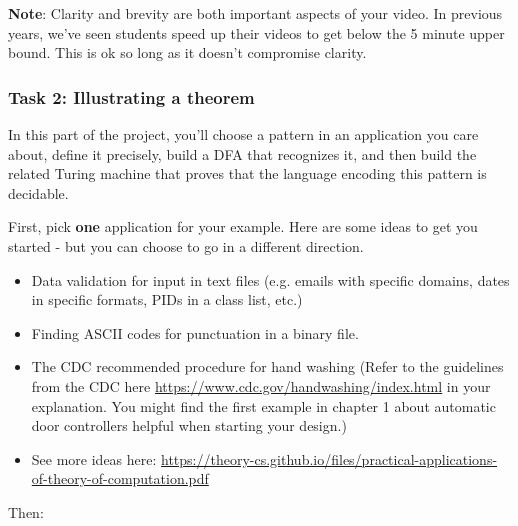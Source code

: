 \documentclass[12pt, oneside]{article}
\begin{document}
{\bf Note}: Clarity and brevity are both important aspects of your video.  In previous years, we've seen 
students speed up their videos to get below the 5 minute upper bound. This is ok so long as it doesn't 
compromise clarity.

\subsubsection*{Task 2: Illustrating a theorem}

In this part of the project, you'll choose a pattern in an application you care about, 
define it precisely, build a DFA that recognizes it, and then build the related Turing machine
that proves that the language encoding this pattern is decidable.

First, pick {\bf one} application for your example. 
Here are some ideas to get you started - but you can choose to go in a different direction.
\begin{itemize}
\item Data validation for input in text files (e.g. emails with specific domains, dates in specific formats, PIDs in a class list, etc.)
\item Finding ASCII codes for punctuation in a binary file.
\item The CDC recommended procedure for hand washing (Refer to the guidelines from the CDC here 
\href{https://www.cdc.gov/handwashing/index.html}{https://www.cdc.gov/handwashing/index.html} in your explanation. 
You might find the first example in chapter 1 about automatic door controllers helpful when starting your design.)
\item See more ideas here:
\href{https://theory-cs.github.io/files/practical-applications-of-theory-of-computation.pdf}{https://theory-cs.github.io/files/practical-applications-of-theory-of-computation.pdf}
\end{itemize}
Then:
\end{document}
